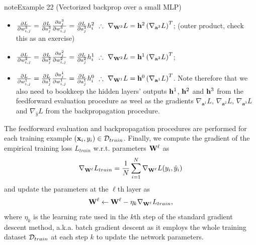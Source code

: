 \documentclass[letterpaper,10pt,english]{jupyterBook}
\begin{document}
\begin{sphinxadmonition}{note}{Example 22 (Vectorized backprop over a small MLP)}
\begin{itemize}
\item {} 
\sphinxAtStartPar
\( {\partial L \over \partial w_{i,j}^{3}} = {\partial L \over \partial a_{j}^{3}} {\partial a_{j}^{3} \over \partial w_{i,j}^{3}} = {\partial L \over \partial a_{j}^{3}} h_{i}^{2} \,\,\therefore\,\, \nabla_{{\bf W}^{3}} L = {\bf h}^{2} \left( \nabla_{\mathbf{a}^{3}} L \right)^{T}\); (outer product, check this as an exercise)

\item {} 
\sphinxAtStartPar
\( {\partial L \over \partial w_{i,j}^{2}} = {\partial L \over \partial a_{j}^{2}} {\partial a_{j}^{2} \over \partial w_{i,j}^{2}} = {\partial L \over \partial a_{j}^{2}} h_{i}^{1} \,\,\therefore\,\, \nabla_{{\bf W}^{2}} L = {\bf h}^{1} \left( \nabla_{\mathbf{a}^{2}} L \right)^{T}\);

\item {} 
\sphinxAtStartPar
\( {\partial L \over \partial w_{i,j}^{1}} = {\partial L \over \partial a_{j}^{1}} {\partial a_{j}^{1} \over \partial w_{i,j}^{1}} = {\partial L \over \partial a_{j}^{1}} h_{i}^{0} \,\,\therefore\,\, \nabla_{{\bf W}^{1}} L = {\bf h}^{0} \left( \nabla_{\mathbf{a}^{1}} L \right)^{T}\).
Note therefore that we also need to bookkeep the hidden layers’ outputs \( {\bf h}^{1} \), \( {\bf h}^{2} \) and \( {\bf h}^{3} \) from the feedforward evaluation procedure as weel as the gradients \( \nabla_{\mathbf{a}^{1}} L \), \( \nabla_{\mathbf{a}^{2}} L \), \( \nabla_{\mathbf{a}^{3}} L\) and \(\nabla_{\hat{y}} L\) from the backpropagation procedure.

\end{itemize}

\sphinxAtStartPar
The feedforward evaluation and backpropagation procedures are performed for each training example \( \left( {\bf x}_{i}, y_{i} \right) \in {\cal D}_{train} \). Finally, we compute the gradient of the empirical training loss \( L_{train} \) w.r.t. parameters \( {\bf W}^{\ell} \) as
\label{equation:neuralnets_backprop:70ad2c14-3faa-48ca-b37e-c844c3b591aa}\begin{equation}
\nabla_{{\bf W}^{\ell}} L_{train} = \frac{1}{N} \sum_{i=1}^{N} \nabla_{{\bf W}^{\ell}} L (y_{i}, \hat{y}_{i})
\end{equation}
\sphinxAtStartPar
and update the parameters at the \(\ell\)\sphinxhyphen{}th layer as
\label{equation:neuralnets_backprop:720bc8cf-b0eb-465d-92e0-5824709cd7f8}\begin{equation}
{\bf W}^{\ell} \gets {\bf W}^{\ell} - \eta_{k} \nabla_{{\bf W}^{\ell}} L_{train},
\end{equation}
\sphinxAtStartPar
where \( \eta_{k} \) is the learning rate used in the \( k \)\sphinxhyphen{}th step of the standard gradient descent method, a.k.a. batch gradient descent as it employs the whole training dataset \( {\cal D}_{train} \) at each step \( k \) to update the network parameters.
\end{sphinxadmonition}
\end{document}
